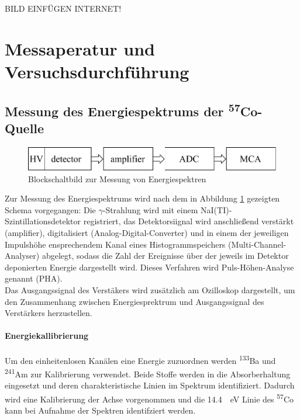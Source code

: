 \documentclass[a4paper,twoside,final]{article}
\begin{document}
BILD EINFÜGEN INTERNET!

\section{Messaperatur und Versuchsdurchführung} \label{sec:Versuchsdurchführung}
\subsection{Messung des Energiespektrums der \textsuperscript{57}Co-Quelle}
\begin{figure}[htp]
    \centering
    \includegraphics{Schaltungen/Blockschaltbild_Energiespektren.pdf}
    \caption{Blockschaltbild zur Messung von Energiespektren}
    \label{fig:BlockEnergiespektren}
\end{figure}

Zur Messung des Energiespektrums wird nach dem in Abbildung \ref{fig:BlockEnergiespektren} gezeigten Schema vorgegangen: Die $\gamma$-Strahlung wird mit einem NaI(TI)-Szintillationsdetektor registriert, das Detektorsiignal wird anschließend verstärkt (amplifier), digitalisiert (Analog-Digital-Converter) und in einem der jeweiligen Impulshöhe ensprechendem Kanal eines Histogrammspeichers (Multi-Channel-Analyser) abgelegt, sodass die Zahl der Ereignisse über der jeweils im Detektor deponierten Energie dargestellt wird. Dieses Verfahren wird Puls-Höhen-Analyse genannt (PHA). \\
Das Ausgangssignal des Verstäkers wird zusätzlich am Ozilloskop dargestellt, um den Zusammenhang zwischen Energiesprektrum und Ausgangssignal des Verstärkers herzustellen. \\
\paragraph{Energiekallibrierung}
Um den einheitenlosen Kanälen eine Energie zuzuordnen werden \textsuperscript{133}Ba und \textsuperscript{241}Am zur Kalibrierung verwendet. Beide Stoffe werden in die Absorberhaltung eingesetzt und deren charakteristische Linien im Spektrum identifiziert. Dadurch wird eine Kalibrierung der Achse vorgenommen und die \SI{14,4}{\kili\eV} Linie des \textsuperscript{57}Co kann bei Aufnahme der Spektren identifziert werden.
\end{document}
